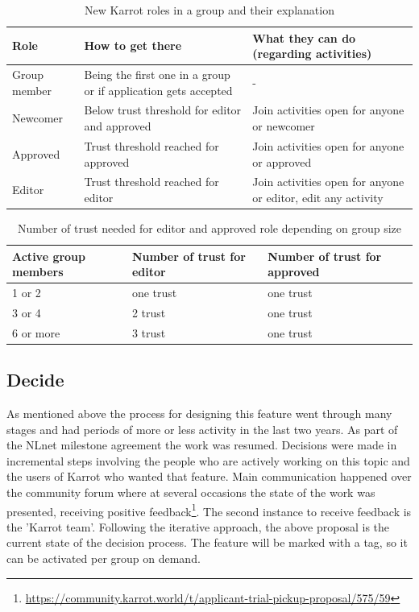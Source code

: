 \documentclass[
	a4paper,%
	11pt,%
	]{article}
\begin{document}
\begin{table}[ht]
	\centering
\caption{New Karrot roles in a group and their explanation}
	\begin{tabular}{p{} p{} p{}}
		\toprule
		Role & How to get there & What they can do (regarding activities)\\
		\midrule
		Group member & Being the first one in a group or if application gets accepted & - \\
		Newcomer & Below trust threshold for \newline editor and approved & Join activities open for anyone or newcomer \\
		Approved & Trust threshold reached for \newline approved & Join activities open for anyone or approved \\
		Editor & Trust threshold reached for \newline editor & Join activities open for anyone or editor, edit any activity\\
		\bottomrule
	\end{tabular}
\label{tab:roles_karrot_new}
\end{table}	

\begin{table}[ht]
	\centering
\caption{Number of trust needed for editor and approved role depending on group size}
	\begin{tabular}{p{} p{} p{}}
		\toprule
		Active group \newline members & Number of trust for \newline editor & Number of trust for \newline approved\\
		\midrule
		1 or 2  & one trust & one trust \\
		3 or 4  & 2 trust & one trust \\
		6 or more & 3 trust & one trust\\
		\bottomrule
	\end{tabular}
\label{tab:roles_karrot_numbers_new}
\end{table}	
	
\subsection{Decide}

As mentioned above the process for designing this feature went through many stages and had periods of more or less activity in the last two years. As part of the NLnet milestone agreement the work was resumed. Decisions were made in incremental steps involving the people who are actively working on this topic and the users of Karrot who wanted that feature. Main communication happened over the community forum where at several occasions the state of the work was presented, receiving positive feedback\footnote{\label{url_forum_feedback}\url{https://community.karrot.world/t/applicant-trial-pickup-proposal/575/59}}. The second instance to receive feedback is the 'Karrot team'. Following the iterative approach, the above proposal is the current state of the decision process. The feature will be marked with a tag, so it can be activated per group on demand.
\end{document}
